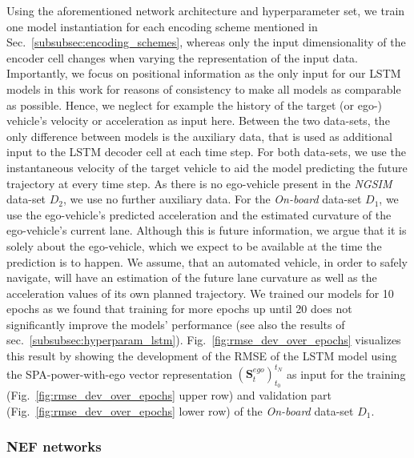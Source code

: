 Using the aforementioned network architecture and hyperparameter set, we train one model instantiation for each encoding scheme mentioned in Sec.~\ref{subsubsec:encoding_schemes}, whereas only the input dimensionality of the encoder cell changes when varying the representation of the input data.
Importantly, we focus on positional information as the only input for our \ac{LSTM} models in this work for reasons of consistency to make all models as comparable as possible.
Hence, we neglect for example the history of the target (or ego-) vehicle's velocity or acceleration as input here.
Between the two data-sets, the only difference between models is the auxiliary data, that is used as additional input to the \ac{LSTM} decoder cell at each time step.
For both data-sets, we use the instantaneous velocity of the target vehicle to aid the model predicting the future trajectory at every time step.
As there is no ego-vehicle present in the \emph{\ac{NGSIM}} data-set $D_2$, we use no further auxiliary data.
For the \emph{On-board} data-set $D_1$, we use the ego-vehicle's predicted acceleration and the estimated curvature of the ego-vehicle's current lane.
Although this is future information, we argue that it is solely about the ego-vehicle, which we expect to be available at the time the prediction is to happen.
We assume, that an automated vehicle, in order to safely navigate, will have an estimation of the future lane curvature as well as the acceleration values of its own planned trajectory.
We trained our models for \num{10} epochs as we found that training for more epochs up until \num{20} does not significantly improve the models' performance (see also the results of sec.~\ref{subsubsec:hyperparam_lstm}).
Fig.~\ref{fig:rmse_dev_over_epochs} visualizes this result by showing the development of the \ac{RMSE} of the \ac{LSTM} model using the \ac{SPA}-power-with-ego vector representation $(\mathbf{S}_{t}^{ego})_{t_0}^{t_N}$ as input for the training (Fig.~\ref{fig:rmse_dev_over_epochs} upper row) and validation part (Fig.~\ref{fig:rmse_dev_over_epochs} lower row) of the \emph{On-board} data-set $D_1$.


\subsubsection{\ac{NEF} networks}

